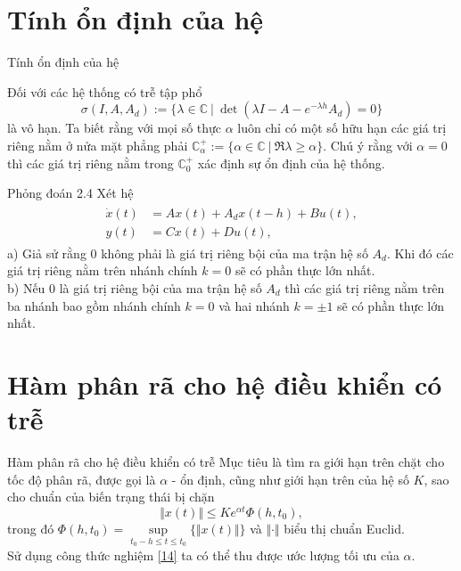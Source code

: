 \documentclass[10pt,notheorems]{beamer}
\theoremstyle{definition}
\theoremstyle{definition}
\theoremstyle{definition}
\def\a{\alpha}
\def\lb{\lambda}
\def\C{\mathbb{C}}
\begin{document}
\section{Tính ổn định của hệ}
\begin{frame}{Tính ổn định của hệ}
	\begin{block}{}
		Đối với các hệ thống có trễ tập phổ
	\begin{equation*}\label{spectrum}
	\sigma(I,A,A_d) := \{\lb \in \mathbb{C} \ | \ \det(\lb I - A - e^{-\lb h}A_d ) = 0\}
	\end{equation*}
	là vô hạn. Ta biết rằng với mọi số thực $\a$ luôn chỉ có một số hữu hạn các giá trị riêng nằm ở nửa mặt phẳng phải 
	$\C^+_{\a}:= \{ \a \in \C \ | \ \Re{\lb}\geq \a \}$.
	Chú ý rằng với $\a=0$ thì các giá trị riêng nằm trong $\C^+_{0}$ xác định sự ổn định của hệ thống.
		
	\end{block}\pause
	
	\begin{block}{Phỏng đoán 2.4}
		Xét hệ \begin{align*}
		\begin{split}
		\dot{x}(t)&=Ax(t)+A_dx(t-h)+Bu(t), \\
		y(t)&=Cx(t)+Du(t),
		\end{split}
		\end{align*}
		a) Giả sử rằng $0$ không phải là giá trị riêng bội của 
		ma trận hệ số $A_d$. Khi đó các giá trị riêng nằm trên nhánh chính $k=0$ sẽ có phần thực lớn nhất. \\
		b) Nếu $0$ là giá trị riêng bội của ma trận hệ số $A_d$ thì các giá trị riêng nằm trên ba nhánh bao gồm nhánh chính $k=0$ và hai nhánh $k=\pm 1$ sẽ có phần thực lớn nhất.
	\end{block}
\end{frame}

\section{Hàm phân rã cho hệ điều khiển có trễ}

\begin{frame}{Hàm phân rã cho hệ điều khiển có trễ}
	Mục tiêu là tìm ra giới hạn trên chặt cho tốc độ phân rã, được gọi là $\alpha$ - ổn định, cũng như giới hạn trên của hệ số $K$, sao cho chuẩn của biến trạng thái bị chặn 
	\begin{equation}\label{17}
	\Vert x(t)\Vert\leq Ke^{\alpha t}\Phi(h,t_0),
	\end{equation} 
	trong đó $\Phi(h,t_0)=\sup\limits_{t_0-h\leq t\leq t_0}\{\Vert x(t)\Vert\}$ và $\Vert \cdot\Vert$ biểu thị chuẩn Euclid. \\
	Sử dụng công thức nghiệm \eqref{14} ta có thể thu được ước lượng tối ưu của $\alpha$.	
\end{frame}
\end{document}
